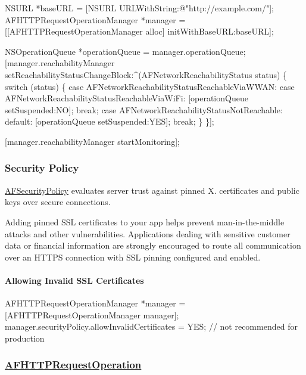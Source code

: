 \begin{DoxyCode}
NSURL *baseURL = [NSURL URLWithString:@"http://example.com/"];
AFHTTPRequestOperationManager *manager = [[AFHTTPRequestOperationManager alloc] initWithBaseURL:baseURL];

NSOperationQueue *operationQueue = manager.operationQueue;
[manager.reachabilityManager setReachabilityStatusChangeBlock:^(AFNetworkReachabilityStatus status) \{
    switch (status) \{
        case AFNetworkReachabilityStatusReachableViaWWAN:
        case AFNetworkReachabilityStatusReachableViaWiFi:
            [operationQueue setSuspended:NO];
            break;
        case AFNetworkReachabilityStatusNotReachable:
        default:
            [operationQueue setSuspended:YES];
            break;
    \}
\}];

[manager.reachabilityManager startMonitoring];
\end{DoxyCode}
 



\subsubsection*{Security Policy}

{\ttfamily \mbox{\hyperlink{interface_a_f_security_policy}{A\+F\+Security\+Policy}}} evaluates server trust against pinned X. certificates and public keys over secure connections.

Adding pinned S\+SL certificates to your app helps prevent man-\/in-\/the-\/middle attacks and other vulnerabilities. Applications dealing with sensitive customer data or financial information are strongly encouraged to route all communication over an H\+T\+T\+PS connection with S\+SL pinning configured and enabled.

\paragraph*{Allowing Invalid S\+SL Certificates}


\begin{DoxyCode}
AFHTTPRequestOperationManager *manager = [AFHTTPRequestOperationManager manager];
manager.securityPolicy.allowInvalidCertificates = YES; // not recommended for production
\end{DoxyCode}
 



\subsubsection*{\mbox{\hyperlink{interface_a_f_h_t_t_p_request_operation}{A\+F\+H\+T\+T\+P\+Request\+Operation}}}

